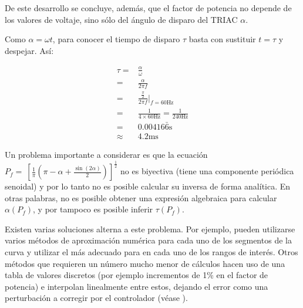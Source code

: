 De este desarrollo se concluye, además, que el factor de potencia no depende de los valores de voltaje, sino sólo del ángulo de disparo del TRIAC $\alpha$.

Como $\alpha = \omega t$, para conocer el tiempo de disparo $\tau$ basta con sustituir $t=\tau$ y despejar.
Así:

\begin{align*}
	\tau =& \frac{\alpha}{\omega} \\
	=&
		\frac{\alpha}{2 \pi f} \\
	=&
		\frac{\frac{\pi}{2}}{2 \pi f}\bigg\rvert_{f=60\text{Hz}}
		\\
	=&
		\frac{1}{4 \times 60\text{Hz}} =
		\frac{1}{240\text{Hz}}
		\\
	=& 0.00416\bar{6}\text{s} \\
	\approx& 4.2\text{ms}
\end{align*}

Un problema importante a considerar es que la ecuación
\(
	P_f = {~\left[
		\frac{1}{\pi}
		\left(
			\pi-\alpha + \frac{\sin\left(2\alpha\right)}{2}
		\right)
	\right]}^\frac{1}{2}
\)
no es biyectiva (tiene una componente periódica senoidal) y por lo tanto no es posible calcular su inversa de forma analítica.
En otras palabras, no es posible obtener una expresión algebraica para calcular $\alpha\left(P_f\right)$, y por tampoco es posible inferir $\tau\left(P_f\right)$.

Existen varias soluciones alterna a este problema.
Por ejemplo, pueden utilizarse varios métodos de aproximación numérica para cada uno de los segmentos de la curva y utilizar el más adecuado para en cada uno de los rangos de interés.
Otros métodos que requieren un número mucho menor de cálculos hacen uso de una tabla de valores discretos (por ejemplo incrementos de 1\% en el factor de potencia) e interpolan linealmente entre estos, dejando el error como una perturbación a corregir por el controlador (véase ).


